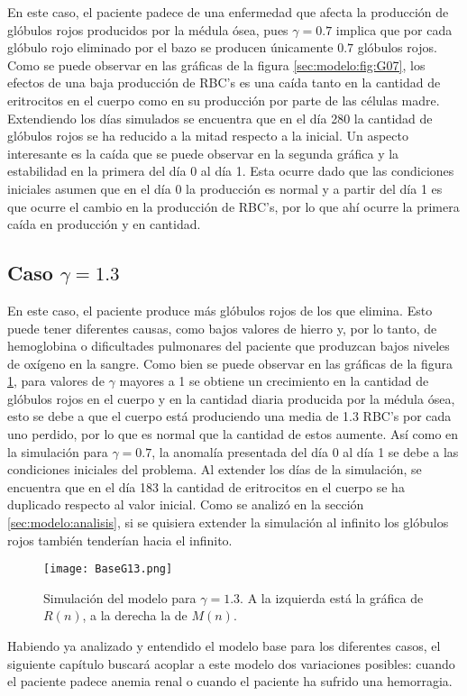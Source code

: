 En este caso, el paciente padece de una enfermedad que afecta la producción de glóbulos rojos producidos por la médula ósea, pues $\gamma=0.7$ implica que por cada glóbulo rojo eliminado por el bazo se producen únicamente $0.7$ glóbulos rojos. Como se puede observar en las gráficas de la figura \ref{sec:modelo:fig:G07}, los efectos de una baja producción de RBC's es una caída tanto en la cantidad de eritrocitos en el cuerpo como en su producción por parte de las células madre. Extendiendo los días simulados se encuentra que en el día 280 la cantidad de glóbulos rojos se ha reducido a la mitad respecto a la inicial. Un aspecto interesante es la caída que se puede observar en la segunda gráfica y la estabilidad en la primera del día 0 al día 1. Esta ocurre dado que las condiciones iniciales asumen que en el día 0 la producción es normal y a partir del día 1 es que ocurre el cambio en la producción de RBC's, por lo que ahí ocurre la primera caída en producción y en cantidad. 


\subsection{Caso $\gamma=1.3$}\label{subsec:modelo:simulaciones:G13}

En este caso, el paciente produce más glóbulos rojos de los que elimina. Esto puede tener diferentes causas, como bajos valores de hierro y, por lo tanto, de hemoglobina o dificultades pulmonares del paciente que produzcan bajos niveles de oxígeno en la sangre. Como bien se puede observar en las gráficas de la figura \ref{sec:modelo:fig:G13}, para valores de $\gamma$ mayores a 1 se obtiene un crecimiento en la cantidad de glóbulos rojos en el cuerpo y en la cantidad diaria producida por la médula ósea, esto se debe a que el cuerpo está produciendo una media de 1.3 RBC's por cada uno perdido, por lo que es normal que la cantidad de estos aumente. Así como en la simulación para $\gamma = 0.7$, la anomalía presentada del día 0 al día 1 se debe a las condiciones iniciales del problema. Al extender los días de la simulación, se encuentra que en el día 183 la cantidad de eritrocitos en el cuerpo se ha duplicado respecto al valor inicial. Como se analizó en la sección \ref{sec:modelo:analisis}, si se quisiera extender la simulación al infinito los glóbulos rojos también tenderían hacia el infinito. 

\begin{figure}[H]
    \centering
    \captionsetup{justification=centering}
    \texttt{[image: BaseG13.png]}
    \caption{Simulación del modelo para $\gamma = 1.3$. A la izquierda está la gráfica de $R(n)$, a la derecha la de $M(n)$.}
    \label{sec:modelo:fig:G13}
\end{figure}
Habiendo ya analizado y entendido el modelo base para los diferentes casos, el siguiente capítulo buscará acoplar a este modelo dos variaciones posibles: cuando el paciente padece anemia renal o cuando el paciente ha sufrido una hemorragia.